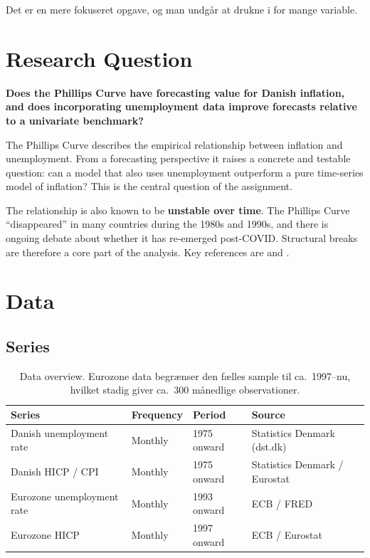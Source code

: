 Det er en mere fokuseret opgave, og man undgår at drukne i for mange variable.

\section{Research Question}

\textbf{Does the Phillips Curve have forecasting value for Danish inflation,
and does incorporating unemployment data improve forecasts relative to a
univariate benchmark?}

The Phillips Curve describes the empirical relationship between inflation
and unemployment. From a forecasting perspective it raises a concrete and
testable question: can a model that also uses unemployment outperform a
pure time-series model of inflation? This is the central question of the
assignment.

The relationship is also known to be \textbf{unstable over time}. The
Phillips Curve ``disappeared'' in many countries during the 1980s and
1990s, and there is ongoing debate about whether it has re-emerged
post-COVID. Structural breaks are therefore a core part of the analysis.
Key references are \textcite{stockwatson1999} and \textcite{galigertler1999}.

\section{Data}

\subsection{Series}

\begin{table}[h!]
\centering
\begin{tabular}{llll}
\toprule
\textbf{Series} & \textbf{Frequency} & \textbf{Period} & \textbf{Source} \\
\midrule
Danish unemployment rate   & Monthly & 1975 onward & Statistics Denmark (dst.dk) \\
Danish HICP / CPI          & Monthly & 1975 onward & Statistics Denmark / Eurostat \\
Eurozone unemployment rate & Monthly & 1993 onward & ECB / FRED \\
Eurozone HICP              & Monthly & 1997 onward & ECB / Eurostat \\
\bottomrule
\end{tabular}
\caption{Data overview. Eurozone data begrænser den fælles sample til ca.\ 1997--nu, hvilket stadig giver ca.\ 300 månedlige observationer.}
\end{table}

